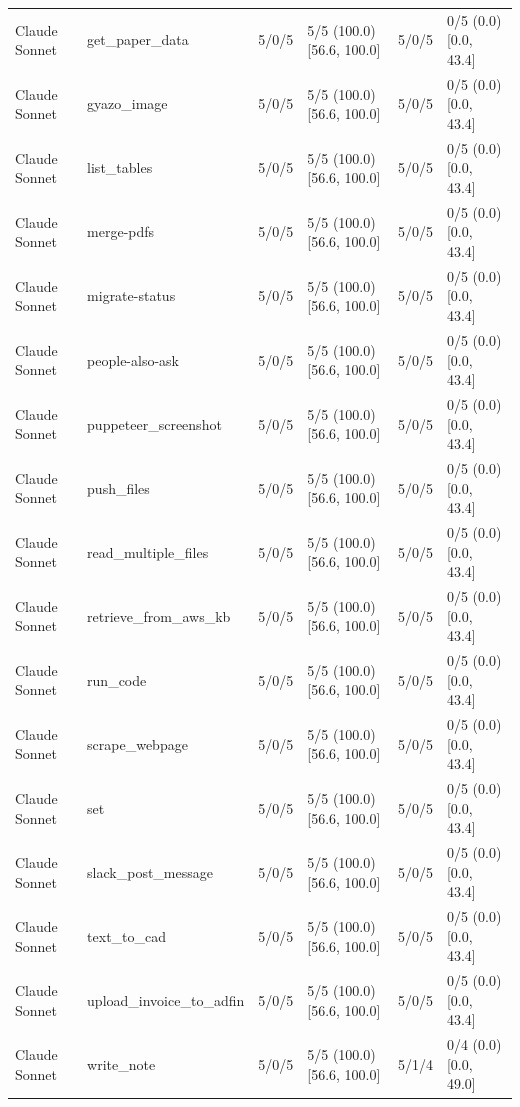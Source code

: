 \begin{center}
\begin{longtable}{@{}lp{}llll@{}}
Claude Sonnet & get\_paper\_data & 5/0/5 & 5/5 (100.0) [56.6, 100.0] & 5/0/5 & 0/5 (0.0) [0.0, 43.4] \\
Claude Sonnet & gyazo\_image & 5/0/5 & 5/5 (100.0) [56.6, 100.0] & 5/0/5 & 0/5 (0.0) [0.0, 43.4] \\
Claude Sonnet & list\_tables & 5/0/5 & 5/5 (100.0) [56.6, 100.0] & 5/0/5 & 0/5 (0.0) [0.0, 43.4] \\
Claude Sonnet & merge-pdfs & 5/0/5 & 5/5 (100.0) [56.6, 100.0] & 5/0/5 & 0/5 (0.0) [0.0, 43.4] \\
Claude Sonnet & migrate-status & 5/0/5 & 5/5 (100.0) [56.6, 100.0] & 5/0/5 & 0/5 (0.0) [0.0, 43.4] \\
Claude Sonnet & people-also-ask & 5/0/5 & 5/5 (100.0) [56.6, 100.0] & 5/0/5 & 0/5 (0.0) [0.0, 43.4] \\
Claude Sonnet & puppeteer\_screenshot & 5/0/5 & 5/5 (100.0) [56.6, 100.0] & 5/0/5 & 0/5 (0.0) [0.0, 43.4] \\
Claude Sonnet & push\_files & 5/0/5 & 5/5 (100.0) [56.6, 100.0] & 5/0/5 & 0/5 (0.0) [0.0, 43.4] \\
Claude Sonnet & read\_multiple\_files & 5/0/5 & 5/5 (100.0) [56.6, 100.0] & 5/0/5 & 0/5 (0.0) [0.0, 43.4] \\
Claude Sonnet & retrieve\_from\_aws\_kb & 5/0/5 & 5/5 (100.0) [56.6, 100.0] & 5/0/5 & 0/5 (0.0) [0.0, 43.4] \\
Claude Sonnet & run\_code & 5/0/5 & 5/5 (100.0) [56.6, 100.0] & 5/0/5 & 0/5 (0.0) [0.0, 43.4] \\
Claude Sonnet & scrape\_webpage & 5/0/5 & 5/5 (100.0) [56.6, 100.0] & 5/0/5 & 0/5 (0.0) [0.0, 43.4] \\
Claude Sonnet & set & 5/0/5 & 5/5 (100.0) [56.6, 100.0] & 5/0/5 & 0/5 (0.0) [0.0, 43.4] \\
Claude Sonnet & slack\_post\_message & 5/0/5 & 5/5 (100.0) [56.6, 100.0] & 5/0/5 & 0/5 (0.0) [0.0, 43.4] \\
Claude Sonnet & text\_to\_cad & 5/0/5 & 5/5 (100.0) [56.6, 100.0] & 5/0/5 & 0/5 (0.0) [0.0, 43.4] \\
Claude Sonnet & upload\_invoice\_to\_adfin & 5/0/5 & 5/5 (100.0) [56.6, 100.0] & 5/0/5 & 0/5 (0.0) [0.0, 43.4] \\
Claude Sonnet & write\_note & 5/0/5 & 5/5 (100.0) [56.6, 100.0] & 5/1/4 & 0/4 (0.0) [0.0, 49.0] \\
\bottomrule
\end{longtable}\end{center}
